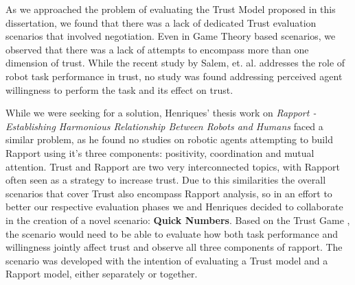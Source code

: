 \label{chap:Scenario}

As we approached the problem of evaluating the Trust Model proposed in this dissertation, we found that there was a lack of dedicated Trust evaluation scenarios that involved negotiation. Even in Game Theory based scenarios, we observed that there was a lack of attempts to encompass more than one dimension of trust. While the recent study by Salem, et. al.\cite{Salem2015b} addresses the role of robot task performance in trust, no study was found addressing perceived agent willingness to perform the task and its effect on trust. 

While we were seeking for a solution, Henriques' thesis work on \textit{Rapport - Establishing Harmonious Relationship Between Robots and Humans} \cite{Henriques2016} faced a similar problem, as he found no studies on robotic agents attempting to build Rapport using it's three components: positivity, coordination and mutual attention. Trust and Rapport are two very interconnected topics, with Rapport often seen as a strategy to increase trust. Due to this similarities the overall scenarios that cover Trust also encompass Rapport analysis, so in an effort to better our respective evaluation phases we and Henriques decided to collaborate in the creation of a novel scenario: \textbf{Quick Numbers}. Based on the Trust Game \cite{JoyceBergJohnDickhaut}, the scenario would need to be able to evaluate how both task performance and willingness jointly affect trust and observe all three components of rapport. The scenario was developed with the intention of evaluating a Trust model and a Rapport model, either separately or together.

